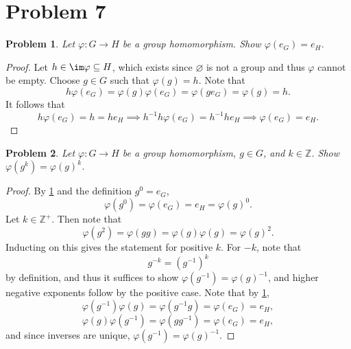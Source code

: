 \documentclass[11pt, letterpaper]{article}
\theoremstyle{plain}
\newtheorem{problem}{Problem}[section]
\begin{document}
\section{Problem 7}
\begin{problem}\label{3.1}
	Let $\varphi : G \to H$ be a group homomorphism. Show $\varphi (e_G)=e_H$.
\end{problem}
\begin{proof}
	Let $h\in \im \varphi \subseteq H$, which exists since $\varnothing $ is not a group and thus $\varphi $ cannot be empty. Choose $g\in G$ such that $\varphi (g)=h$. Note that
	\[
		h\varphi (e_G)=\varphi (g)\varphi (e_G)=\varphi (ge_G)=\varphi (g)=h
	.\]
	It follows that
	\[
		h\varphi (e_G)=h=he_H \implies h^{-1} h\varphi (e_G)=h^{-1} he_H \implies \varphi (e_G)=e_H
	.\]
\end{proof}
\begin{problem}\label{3.2}
	Let $\varphi : G \to H$ be a group homomorphism, $g\in G$, and $k\in\mathbb{Z} $. Show $\varphi (g^k)=\varphi (g)^k$.
\end{problem}
\begin{proof}
	By \cref{3.1} and the definition $g^0=e_G$,
	\[
		\varphi (g^0)=\varphi (e_G)=e_H=\varphi (g)^0
	.\]
	Let $k\in\mathbb{Z} ^+$. Then note that
	\[
		\varphi (g^2)=\varphi (gg)=\varphi (g)\varphi (g)=\varphi (g)^2
	.\]
	Inducting on this gives the statement for positive $k$. For $-k$, note that
	\[
		g^{-k} =\left( g^{-1}  \right) ^k
	\]
	by definition, and thus it suffices to show $\varphi (g^{-1} )=\varphi (g)^{-1} $, and higher negative exponents follow by the positive case. Note that by \cref{3.1},
	\[
		\varphi (g^{-1} )\varphi (g)=\varphi (g^{-1} g)=\varphi (e_G)=e_H,
	\]
	\[
		\varphi (g)\varphi (g^{-1} )=\varphi (gg^{-1} )=\varphi (e_G)=e_H
	,\]
	and since inverses are unique, $\varphi (g^{-1} )=\varphi (g)^{-1} $.
\end{proof}
\end{document}
